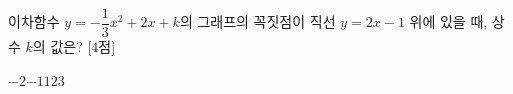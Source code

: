 이차함수 $y=-\dfrac{1}{3}x^2+2x+k$의 그래프의 꼭짓점이 직선 $y=2x-1$ 위에 있을 때, 상수 $k$의 값은? \mbox{[4점]}
\begin{choices32}{$-2$}{$-1$}{$1$}{$2$}{$3$}\end{choices32}
